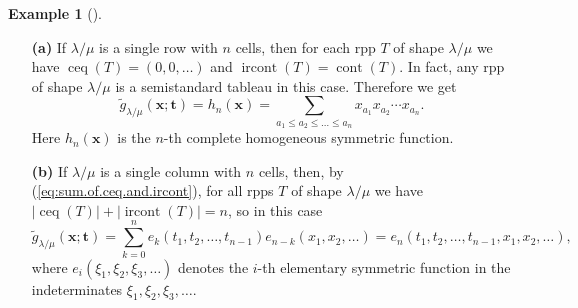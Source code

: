 \documentclass[numbers=enddot,12pt,final,onecolumn,notitlepage]{scrartcl}%
\theoremstyle{definition}
\newtheorem{exmp}[theo]{Example}
\newenvironment{example}[1][]
{\begin{exmp}[#1]\begin{leftbar}}
{\end{leftbar}\end{exmp}}
\let\sumnonlimits\sum
\renewcommand{\sum}{\sumnonlimits\limits}
\def\ceq{{\operatorname{ceq}}}
\def\ircont{{\operatorname{ircont}}}
\def\cont{{\operatorname{cont}}}
\def\g{{\widetilde{g}}}
\def\t{{\mathbf{t}}}
\def\x{{\mathbf{x}}}
\def\lm{{\lambda/\mu}}
\begin{document}
\begin{example}
\label{exa.gtilde.1}

\begin{enumerate}

\item[\textbf{(a)}] If $\lm$ is a single row with $n$ cells, then for each rpp $T$ of shape $\lm$ we have $\ceq(T)=(0,0,\dots)$ and $\ircont(T)=\cont(T)$. In fact, any rpp of shape $\lm$ is a semistandard tableau in this case. Therefore we get 
\[
\g_\lm(\x;\t)=h_n(\x)=\sum_{a_1\leq a_2\leq\dots\leq a_n} x_{a_1}x_{a_2}\cdots x_{a_n}.
\]
 Here $h_n(\x)$ is the $n$-th complete homogeneous symmetric function.


\item[\textbf{(b)}] If $\lm$ is a single column with $n$ cells, then, by (\ref{eq:sum.of.ceq.and.ircont}), for all rpps $T$ of shape $\lm$ we have $|\ceq(T)|+|\ircont(T)|=n$, so in this case
\[
\g_\lm(\x;\t)=\sum_{k=0}^{n}e_{k}\left(  t_{1},t_{2},\ldots,t_{n-1}\right)
e_{n-k}\left(  x_{1},x_{2},\ldots\right) =e_n(t_1,t_2,\dots,t_{n-1},x_1,x_2,\dots),
\]
where $e_{i}\left(  \xi_{1},\xi_{2},\xi_{3},\ldots\right)  $ denotes the
$i$-th elementary symmetric function in the indeterminates $\xi_{1},\xi
_{2},\xi_{3},\ldots$. 



\end{enumerate}
\end{example}
\end{document}
